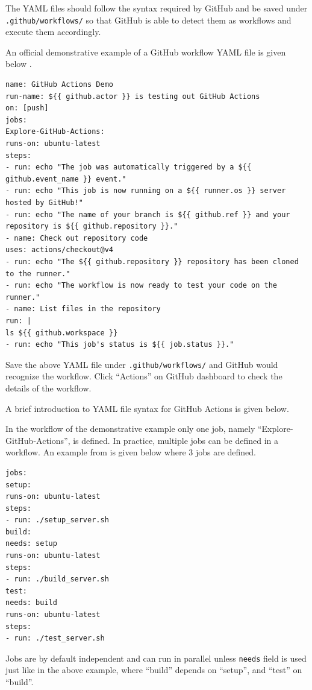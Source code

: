 The YAML files should follow the syntax required by GitHub and be saved under \verb|.github/workflows/| so that GitHub is able to detect them as workflows and execute them accordingly.

An official demonstrative example of a GitHub workflow YAML file is given below \cite{git2025reference}. 

\begin{lstlisting}
name: GitHub Actions Demo
run-name: ${{ github.actor }} is testing out GitHub Actions
on: [push]
jobs:
Explore-GitHub-Actions:
runs-on: ubuntu-latest
steps:
- run: echo "The job was automatically triggered by a ${{ github.event_name }} event."
- run: echo "This job is now running on a ${{ runner.os }} server hosted by GitHub!"
- run: echo "The name of your branch is ${{ github.ref }} and your repository is ${{ github.repository }}."
- name: Check out repository code
uses: actions/checkout@v4
- run: echo "The ${{ github.repository }} repository has been cloned to the runner."
- run: echo "The workflow is now ready to test your code on the runner."
- name: List files in the repository
run: |
ls ${{ github.workspace }}
- run: echo "This job's status is ${{ job.status }}."
\end{lstlisting}

Save the above YAML file under \verb|.github/workflows/| and GitHub would recognize the workflow. Click ``Actions'' on GitHub dashboard to check the details of the workflow.

A brief introduction to YAML file syntax for GitHub Actions is given below.

In the workflow of the demonstrative example only one job, namely ``Explore-GitHub-Actions'', is defined. In practice, multiple jobs can be defined in a workflow. An example from \cite{git2025reference} is given below where 3 jobs are defined.
\begin{lstlisting}
jobs:
setup:
runs-on: ubuntu-latest
steps:
- run: ./setup_server.sh
build:
needs: setup
runs-on: ubuntu-latest
steps:
- run: ./build_server.sh
test:
needs: build
runs-on: ubuntu-latest
steps:
- run: ./test_server.sh
\end{lstlisting}
Jobs are by default independent and can run in parallel unless \verb|needs| field is used just like in the above example, where ``build'' depends on ``setup'', and ``test'' on ``build''.

